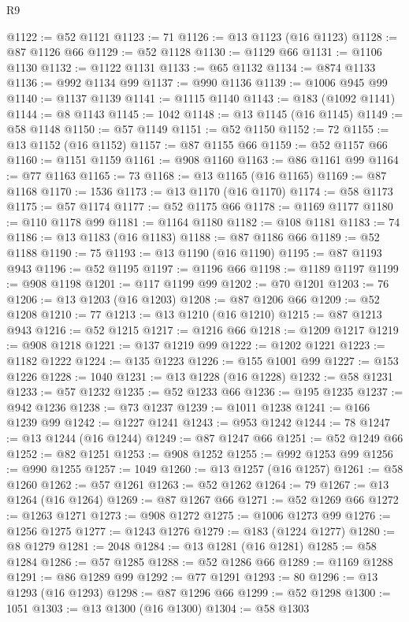 \begin{lexlean}{R9}
\begin{coremodule}
@1122 := @52 @1121
@1123 := 71
@1126 := @13 @1123 (@16 @1123)
@1128 := @87 @1126 @66
@1129 := @52 @1128
@1130 := @1129 @66
@1131 := @1106 @1130
@1132 := @1122 @1131
@1133 := @65 @1132
@1134 := @874 @1133
@1136 := @992 @1134 @99
@1137 := @990 @1136
@1139 := @1006 @945 @99
@1140 := @1137 @1139
@1141 := @1115 @1140
@1143 := @183 (@1092 @1141)
@1144 := @8 @1143
@1145 := 1042
@1148 := @13 @1145 (@16 @1145)
@1149 := @58 @1148
@1150 := @57 @1149
@1151 := @52 @1150
@1152 := 72
@1155 := @13 @1152 (@16 @1152)
@1157 := @87 @1155 @66
@1159 := @52 @1157 @66
@1160 := @1151 @1159
@1161 := @908 @1160
@1163 := @86 @1161 @99
@1164 := @77 @1163
@1165 := 73
@1168 := @13 @1165 (@16 @1165)
@1169 := @87 @1168
@1170 := 1536
@1173 := @13 @1170 (@16 @1170)
@1174 := @58 @1173
@1175 := @57 @1174
@1177 := @52 @1175 @66
@1178 := @1169 @1177
@1180 := @110 @1178 @99
@1181 := @1164 @1180
@1182 := @108 @1181
@1183 := 74
@1186 := @13 @1183 (@16 @1183)
@1188 := @87 @1186 @66
@1189 := @52 @1188
@1190 := 75
@1193 := @13 @1190 (@16 @1190)
@1195 := @87 @1193 @943
@1196 := @52 @1195
@1197 := @1196 @66
@1198 := @1189 @1197
@1199 := @908 @1198
@1201 := @117 @1199 @99
@1202 := @70 @1201
@1203 := 76
@1206 := @13 @1203 (@16 @1203)
@1208 := @87 @1206 @66
@1209 := @52 @1208
@1210 := 77
@1213 := @13 @1210 (@16 @1210)
@1215 := @87 @1213 @943
@1216 := @52 @1215
@1217 := @1216 @66
@1218 := @1209 @1217
@1219 := @908 @1218
@1221 := @137 @1219 @99
@1222 := @1202 @1221
@1223 := @1182 @1222
@1224 := @135 @1223
@1226 := @155 @1001 @99
@1227 := @153 @1226
@1228 := 1040
@1231 := @13 @1228 (@16 @1228)
@1232 := @58 @1231
@1233 := @57 @1232
@1235 := @52 @1233 @66
@1236 := @195 @1235
@1237 := @942 @1236
@1238 := @73 @1237
@1239 := @1011 @1238
@1241 := @166 @1239 @99
@1242 := @1227 @1241
@1243 := @953 @1242
@1244 := 78
@1247 := @13 @1244 (@16 @1244)
@1249 := @87 @1247 @66
@1251 := @52 @1249 @66
@1252 := @82 @1251
@1253 := @908 @1252
@1255 := @992 @1253 @99
@1256 := @990 @1255
@1257 := 1049
@1260 := @13 @1257 (@16 @1257)
@1261 := @58 @1260
@1262 := @57 @1261
@1263 := @52 @1262
@1264 := 79
@1267 := @13 @1264 (@16 @1264)
@1269 := @87 @1267 @66
@1271 := @52 @1269 @66
@1272 := @1263 @1271
@1273 := @908 @1272
@1275 := @1006 @1273 @99
@1276 := @1256 @1275
@1277 := @1243 @1276
@1279 := @183 (@1224 @1277)
@1280 := @8 @1279
@1281 := 2048
@1284 := @13 @1281 (@16 @1281)
@1285 := @58 @1284
@1286 := @57 @1285
@1288 := @52 @1286 @66
@1289 := @1169 @1288
@1291 := @86 @1289 @99
@1292 := @77 @1291
@1293 := 80
@1296 := @13 @1293 (@16 @1293)
@1298 := @87 @1296 @66
@1299 := @52 @1298
@1300 := 1051
@1303 := @13 @1300 (@16 @1300)
@1304 := @58 @1303

\end{coremodule}
\end{lexlean}
